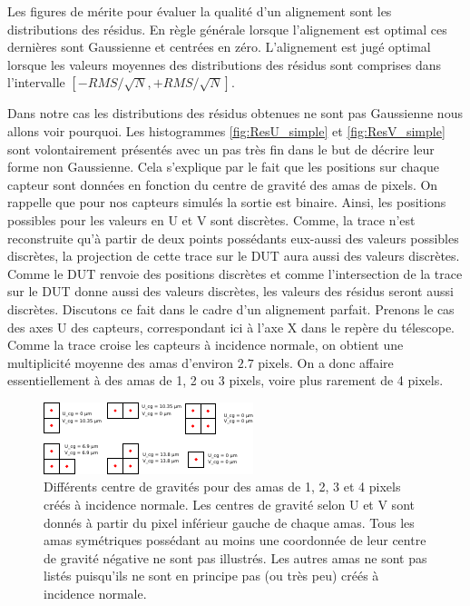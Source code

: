   \medskip
   
   Les figures de m\'erite pour \'evaluer la qualit\'e d'un alignement sont les distributions des r\'esidus. En r\`egle g\'en\'erale lorsque l'alignement est optimal ces derni\`eres sont Gaussienne et centr\'ees en z\'ero. L'alignement est jug\'e optimal lorsque les valeurs moyennes des distributions des r\'esidus sont comprises dans l'intervalle $[-RMS/\sqrt{N} , +RMS/\sqrt{N}]$.
   
   \medskip
   
   Dans notre cas les distributions des r\'esidus obtenues ne sont pas Gaussienne nous allons voir pourquoi. Les histogrammes \ref{fig:ResU_simple} et \ref{fig:ResV_simple} sont volontairement pr\'esent\'es avec un pas tr\`es fin dans le but de d\'ecrire leur forme non Gaussienne. Cela s'explique par le fait que les positions sur chaque capteur sont donn\'ees en fonction du centre de gravit\'e des amas de pixels. On rappelle que pour nos capteurs simul\'es la sortie est binaire. Ainsi, les positions possibles pour les valeurs en U et V sont discr\`etes. Comme, la trace n'est reconstruite qu'\`a partir de deux points poss\'edants eux-aussi des valeurs possibles discr\`etes, la projection de cette trace sur le DUT aura aussi des valeurs discr\`etes. Comme le DUT renvoie des positions discr\`etes et comme l'intersection de la trace sur le DUT donne aussi des valeurs discr\`etes, les valeurs des r\'esidus seront aussi discr\`etes. Discutons ce fait dans le cadre d'un alignement parfait. Prenons le cas des axes U des capteurs, correspondant ici \`a l'axe X dans le rep\`ere du t\'elescope. Comme la trace croise les capteurs \`a incidence normale, on obtient une multiplicit\'e moyenne des amas d'environ $2.7$ pixels. On a donc affaire essentiellement \`a des amas de 1, 2 ou 3 pixels, voire plus rarement de 4 pixels. 
   
   \begin{figure}[!htb]
    \begin{center}
      \includegraphics[scale=3.0]{./figures/cluster_CG.pdf}
      \caption{Diff\'erents centre de gravit\'es pour des amas de 1, 2, 3 et 4 pixels cr\'eés \`a incidence normale. Les centres de gravit\'e selon U et V sont donn\'es \`a partir du pixel inf\'erieur gauche de chaque amas. Tous les amas sym\'etriques poss\'edant au moins une coordonn\'ee de leur centre de gravit\'e n\'egative ne sont pas illustr\'es. Les autres amas ne sont pas list\'es puisqu'ils ne sont en principe pas (ou tr\`es peu) cr\'e\'es \`a incidence normale.}
      \label{fig:Cluster_CG}
    \end{center}
   \end{figure} 
   
